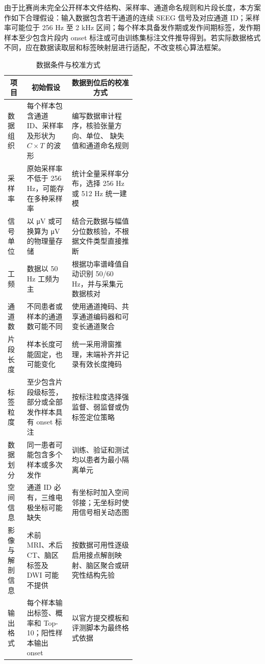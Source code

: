 \documentclass{cumcmthesis}
\numberwithin{figure}{section} %
\numberwithin{table}{section} %
\begin{document}
由于比赛尚未完全公开样本文件结构、采样率、通道命名规则和片段长度，本方案作如下合理假设：输入数据包含若干通道的连续 SEEG 信号及对应通道 ID；采样率可能位于 256 Hz 至 2 kHz 区间；每个样本具备发作期或发作间期标签，发作期样本至少包含片段内 onset 标注或可由训练集标注文件推导得到。若实际数据格式不同，应在数据读取层和标签映射层进行适配，不改变核心算法框架。
\begin{table}[htbp]
    \centering
    \caption{数据条件与校准方式}
    \label{tab:data-conditions}

    \renewcommand{\arraystretch}{1.5}
    \setlength{\tabcolsep}{5pt}

    \begin{tabularx}{\linewidth}{@{}
        p{0.15\linewidth}
        p{0.35\linewidth}
        X
    @{}}
        \toprule[1pt]
        
        \multicolumn{1}{c}{\textbf{项目}} &
        \multicolumn{1}{c}{\textbf{初始假设}} &
        \multicolumn{1}{c}{\textbf{数据到位后的校准方式}}  \\
        \midrule

        数据组织 &
        每个样本包含通道 ID、采样率及形状为
        $C \times T$ 的波形 &
        编写数据审计程序，核验张量方向、单位、
        缺失值和通道命名规则  \\

        采样率&原始采样率不低于 256 Hz，可能存在多种采样率	& 统计全量采样率分布，选择 256 Hz 或 512 Hz 统一建模\\
        信号单位	& 以 μV 或可换算为 μV 的物理量存储	& 结合元数据与幅值分位数核验，不根据文件类型直接推断\\
        工频	& 数据以 50 Hz 工频为主	& 根据功率谱峰值自动识别 50/60 Hz，并与采集元数据核对\\
        通道数	& 不同患者或样本的通道数可能不同& 使用通道掩码、共享通道编码器和可变长通道聚合\\
        片段长度	& 样本长度可能固定，也可能变化	& 统一采用滑窗推理，末端补齐并记录有效长度掩码\\
        标签粒度	& 至少包含片段级标签，部分或全部发作样本具有 onset 标注	& 按标注粒度选择强监督、弱监督或伪标签定位策略\\
        数据划分& 	同一患者可能包含多个样本或多次发作	& 训练、验证和测试均以患者为最小隔离单元\\
        空间信息	& 通道 ID 必有，三维电极坐标可能缺失	& 有坐标时加入空间邻接；无坐标时使用信号相关动态图\\
        影像与解剖信息& 	术前 MRI、术后 CT、脑区标签及 DWI 可能不提供	& 按数据可用性逐级启用接点解剖映射、脑区聚合或研究性结构先验\\
        输出格式	& 每个样本输出标签、概率和 Top-10；阳性样本输出 onset	& 以官方提交模板和评测脚本为最终格式依据\\
        \bottomrule[1pt]

    \end{tabularx}
\end{table}
\end{document}
